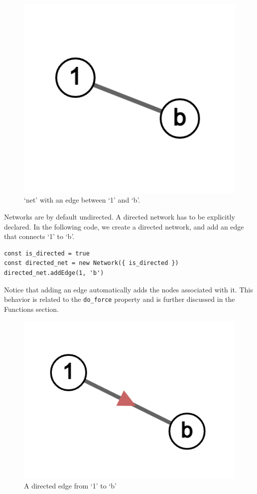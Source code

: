 \begin{figure}[H]
  \centering
  \includegraphics[scale=.25]{img/ex_net_1b.png}
  \caption{`net' with an edge between `1' and `b'.}
  \label{fig:net_1b}
\end{figure}

Networks are by default undirected.
A directed network has to be explicitly declared.
In the following code, we create a directed network,
and add an edge that connects `1' to `b'.

\begin{verbatim}
const is_directed = true
const directed_net = new Network({ is_directed })
directed_net.addEdge(1, 'b')
\end{verbatim}

Notice that adding an edge automatically adds the nodes associated with it.
This behavior is related to the \texttt{do_force} property and
is further discussed in the Functions section.

\begin{figure}[H]
  \centering
  \includegraphics[scale=.25]{img/ex_net_1b_dir.png}
  \caption{A directed edge from `1' to `b'}
  \label{fig:net_1b_dir}
\end{figure}

